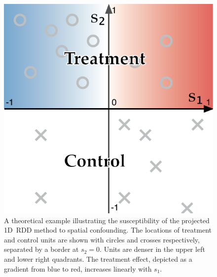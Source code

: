 \documentclass[letter]{article}
\makeatletter
\def\maxwidth{\ifdim\Gin@nat@width>\linewidth\linewidth
\else\Gin@nat@width\fi}
\let\Oldincludegraphics\includegraphics
\renewcommand{\includegraphics}[1]{\Oldincludegraphics[width=0.9\maxwidth]{#1}}
\makeatother
\begin{document}
    	\begin{figure}
\centering
\includegraphics{figures/confounding/confounding.pdf}
\caption{A theoretical example illustrating the susceptibility of the projected 1D~RDD method to spatial confounding. The locations of treatment and control units are shown with circles and crosses respectively, separated by a border at \(s_2 = 0\). Units are denser in the upper left and lower right quadrants. The treatment effect, depicted as a gradient from blue to red, increases linearly with \(s_1\). \label{fig:confounding}}
\end{figure}
    
\end{document}
